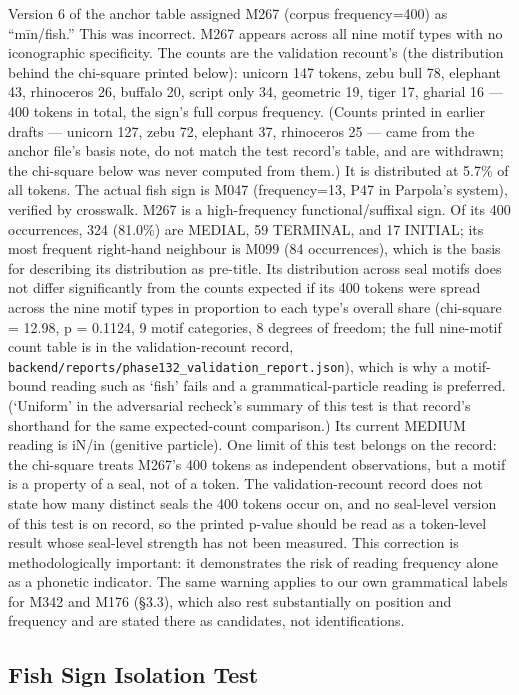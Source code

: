 \documentclass[11pt]{article}
\begin{document}
Version 6 of the anchor table assigned M267 (corpus frequency=400) as
``mīn/fish.'' This was incorrect. M267 appears across all nine motif types with no iconographic specificity. The counts are the validation recount's (the distribution behind the chi-square printed below): unicorn 147 tokens, zebu bull 78, elephant 43, rhinoceros 26, buffalo 20, script only 34, geometric 19, tiger 17, gharial 16 --- 400 tokens in total, the sign's full corpus frequency. (Counts printed in earlier drafts --- unicorn 127, zebu 72, elephant 37, rhinoceros 25 --- came from the anchor file's basis note, do not match the test record's table, and are withdrawn; the chi-square below was never computed from them.) It is distributed at
5.7\% of all tokens. The actual fish sign is M047 (frequency=13, P47 in
Parpola's system), verified by crosswalk. M267 is a high-frequency functional/suffixal sign. Of its 400 occurrences, 324 (81.0\%) are MEDIAL, 59 TERMINAL, and 17 INITIAL; its most frequent right-hand neighbour is M099 (84 occurrences), which is the basis for describing its distribution as pre-title. Its distribution across seal motifs does not differ significantly from the counts expected if its 400 tokens were spread across the nine motif types in proportion to each type's overall share (chi-square = 12.98, p = 0.1124, 9 motif categories, 8 degrees of freedom; the full nine-motif count table is in the validation-recount record, \texttt{backend/reports/phase132\_validation\_report.json}), which is why a motif-bound reading such as `fish' fails and a grammatical-particle reading is preferred. (`Uniform' in the adversarial recheck's summary of this test is that record's shorthand for the same expected-count comparison.) Its current MEDIUM reading is iN/in (genitive particle). One limit of this test belongs on the record: the chi-square treats M267's 400 tokens as independent observations, but a motif is a property of a seal, not of a token. The validation-recount record does not state how many distinct seals the 400 tokens occur on, and no seal-level version of this test is on record, so the printed p-value should be read as a token-level result whose seal-level strength has not been measured. This correction is methodologically important: it demonstrates the risk of reading frequency alone as a phonetic indicator. The same warning applies to our own grammatical labels for M342 and M176 (§3.3), which also rest substantially on position and frequency and are stated there as candidates, not identifications.

\subsection{Fish Sign Isolation
 Test}\label{fish-sign-isolation-test}
\end{document}
